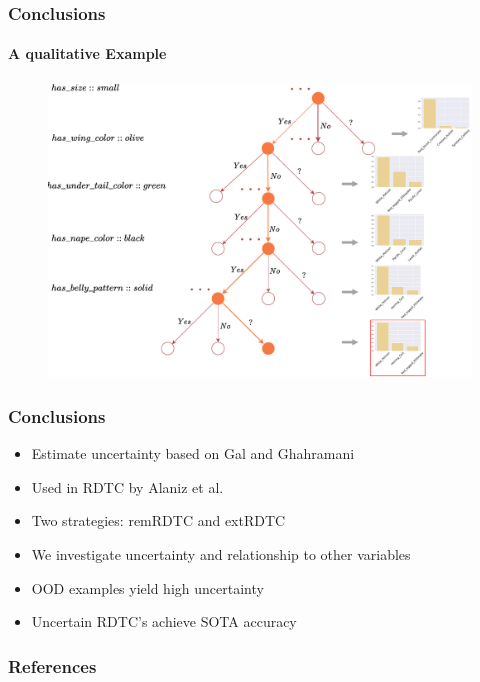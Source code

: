 \documentclass[9pt]{beamer}
\begin{document}
\begin{frame}
\frametitle{Conclusions}
\framesubtitle{A qualitative Example}
\begin{figure}
	\centering
	\includegraphics[width=1\textwidth]{images/example_tree.pdf}
\label{fig:example_tree}
\end{figure}
\end{frame} 







\begin{frame}
\frametitle{Conclusions}
\begin{itemize}
	\item Estimate uncertainty based on Gal and Ghahramani \cite{gal2016dropout}
	\item Used in RDTC by Alaniz et al. \cite{alaniz2019explainable}
	\item Two strategies: remRDTC and extRDTC
	\item We investigate uncertainty and relationship to other variables
	\item OOD examples yield high uncertainty
	\item Uncertain RDTC's achieve SOTA accuracy
\end{itemize}
\end{frame}




\begin{frame}
\frametitle{References}
	
	
\end{frame}
\end{document}

